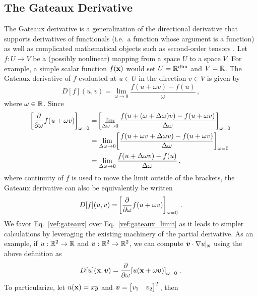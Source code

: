 \documentclass[../doc.tex]{subfiles}
\begin{document}
\subsection{The Gateaux Derivative}
The Gateaux derivative is a generalization of the directional derivative that supports derivatives of functionals (i.e.~a function whose argument is a function) as well as complicated mathematical objects such as second-order tensors \cite{vainberg64}. Let $f : U\rightarrow V$ be a (possibly nonlinear) mapping from a space $U$ to a space $V$. For example, a simple scalar function $f(\boldsymbol{\mathrm{x}})$ would set $U = \mathbb{R}^{\dim}$ and $V = \mathbb{R}$. The Gateaux derivative of $f$ evaluated at $u\in U$ in the direction $v \in V$ is given by 
	\begin{equation} \label{vef:gateaux_limit}
		D[f](u,v) = \lim_{\omega\rightarrow 0} \frac{f(u+\omega v) - f(u)}{\omega} \,,
	\end{equation}
where $\omega\in \mathbb{R}$. Since 
	\begin{equation}
	\begin{aligned}
		\!\left[ \frac{\partial }{\partial \omega}f(u + \omega v) \right]_{\omega=0} &= \!\left[ \lim_{\Delta\omega \rightarrow 0} \frac{f(u+(\omega+\Delta\omega)v) - f(u + \omega v)}{\Delta\omega} \right]_{\omega=0} \\
		&= \lim_{\Delta\omega \rightarrow 0}\!\left[ \frac{f(u + \omega v + \Delta\omega v) - f(u + \omega v)}{\Delta\omega} \right]_{\omega=0} \\
		&= \lim_{\Delta\omega\rightarrow 0} \frac{f(u + \Delta\omega v) - f(u)}{\Delta\omega} \,,
	\end{aligned}
	\end{equation}
where continuity of $f$ is used to move the limit outside of the brackets, the Gateaux derivative can also be equivalently be written 
	\begin{equation} \label{vef:gateaux}
		D[f](u,v) = \!\left[ \frac{\partial }{\partial \omega}f(u + \omega v) \right]_{\omega=0} \,. 
	\end{equation}
We favor Eq.~\ref{vef:gateaux} over Eq.~\ref{vef:gateaux_limit} as it leads to simpler calculations by leveraging the existing machinery of the partial derivative. As an example, if $u : \mathbb{R}^2 \rightarrow \mathbb{R}$ and $\boldsymbol{v} : \mathbb{R}^2 \rightarrow \mathbb{R}^2$, we can compute $\boldsymbol{v}\cdot\nabla u|_{\boldsymbol{\mathrm{x}}}$ using the above definition as 
	\begin{equation}
		D[u](\boldsymbol{\mathrm{x}},\boldsymbol{v}) = \frac{\partial }{\partial \omega}\!\left[ u(\boldsymbol{\mathrm{x}} + \omega\boldsymbol{v}) \right]_{\omega = 0} \,. 
	\end{equation}
To particularize, let $u(\boldsymbol{\mathrm{x}}) = xy$ and $\boldsymbol{v} = \begin{bmatrix} v_1 & v_2 \end{bmatrix}^T$, then 
\end{document}
